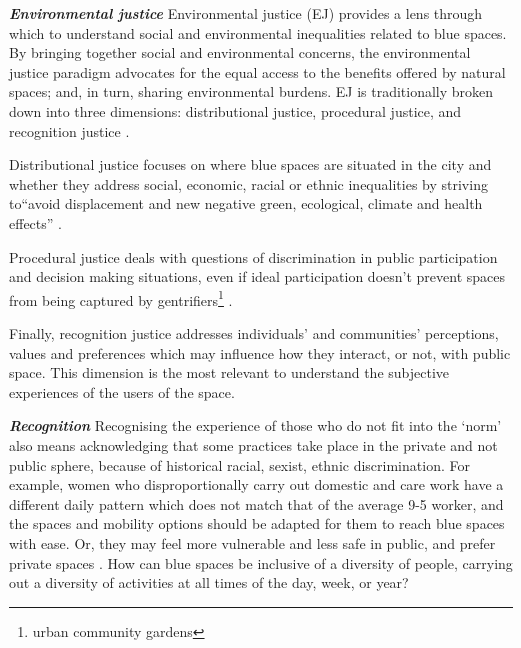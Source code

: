 \documentclass{article}
\newcommand{\bisection}[1]{\textbf{\textit{#1}}}
\begin{document}
\bisection{Environmental justice}
Environmental justice (EJ) provides a lens through which to understand social and environmental inequalities related to blue spaces. By bringing together social and environmental concerns, the environmental justice paradigm advocates for the equal access to the benefits offered by natural spaces; and, in turn, sharing environmental burdens. 
EJ is traditionally broken down into three dimensions: distributional justice, procedural justice, and recognition justice \parencite{todo:cite schlosberg}.

Distributional justice focuses on where blue spaces are situated in the city and whether they address social, economic, racial or ethnic inequalities by striving to``avoid displacement and new negative green, ecological, climate and health effects'' \parencite{anguelovski2020expanding}.

Procedural justice deals with questions of discrimination in public participation and decision making situations, even if ideal participation doesn't prevent spaces from being captured by gentrifiers\footnote{urban community gardens} \parencite{anguelovski2020expanding}. 

Finally, recognition justice addresses individuals' and communities’ perceptions, values and preferences which may influence how they interact, or not, with public space. This dimension is the most relevant to understand the subjective experiences of the users of the space.

\bisection{Recognition}
Recognising the experience of those who do not fit into the `norm' also means acknowledging that some practices take place in the private and not public sphere, because of historical racial, sexist, ethnic discrimination. For example, women who disproportionally carry out domestic and care work have a different daily pattern which does not match that of the average 9-5 worker, and the spaces and mobility options should be adapted for them to reach blue spaces with ease. Or, they may feel more vulnerable and less safe in public, and prefer private spaces \parencite{wessells2014urban}. How can blue spaces be inclusive of a diversity of people, carrying out a diversity of activities at all times of the day, week, or year? 
\end{document}
